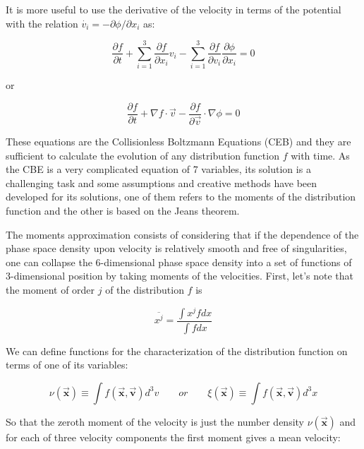 It is more useful to use the derivative of the velocity in terms of the potential with the relation $\dot{v_{i}}=-\partial\phi / \partial x_{i}$ as:

\begin{equation}
\frac{\partial f}{\partial t}+\sum_{i=1}^{3}\frac{\partial f}{\partial x_{i}}v_{i}-\sum_{i=1}^{3}\frac{\partial f}{\partial v_{i}}\frac{\partial\phi}{\partial x_{i}}=0
\end{equation}

or

\begin{equation}
\frac{\partial f}{\partial t}+\nabla f\cdot\vec{v}-\frac{\partial f}{\partial\overrightarrow{v}}\cdot\nabla\phi=0
\end{equation}

These equations are the Collisionless Boltzmann Equations (CEB) and they are sufficient to calculate the evolution of any distribution function $f$ with time. As the CBE is a very complicated equation of 7 variables, its solution is a challenging task and some assumptions and creative methods have been developed for its solutions, one of them refers to the moments of the distribution function and the other is based on the Jeans theorem.

The moments approximation consists of considering that if the dependence of the phase space density upon velocity is relatively smooth and free of singularities, one can collapse the 6-dimensional phase space density into a set of functions of 3-dimensional position by taking moments of the velocities. First, let's note that the moment of order $j$ of the distribution $f$ is

\begin{equation}
\overline{x^{j}}=\frac {\int x^{j}fdx}{\int fdx}
\end{equation}

We can define functions for the characterization of the distribution function on terms of one of its variables:

\begin{equation}
\nu(\vec{\textbf{x}})\equiv \int f(\vec{\textbf{x}},\vec{\textbf{v}})d^{3}v\quad\quad or \quad\quad  \xi(\vec{\textbf{x}})\equiv \int f(\vec{\textbf{x}},\vec{\textbf{v}})d^{3}x
\end{equation}

So that the zeroth moment of the velocity is just the number density $\nu(\vec{\textbf{x}})$ and for each of three velocity components the first moment gives a mean velocity:

